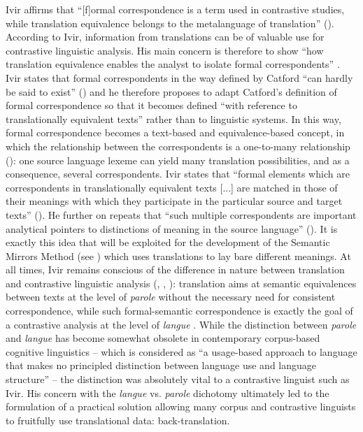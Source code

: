 Ivir affirms that “[f]ormal correspondence is a term used in contrastive studies, while translation equivalence belongs to the metalanguage of translation” (\citeyear[51]{ivir_formal_1981}). According to Ivir, information from translations can be of valuable use for contrastive linguistic analysis. His main concern is therefore to show “how translation equivalence enables the analyst to isolate formal correspondents” \citep[58]{ivir_formal_1981}. Ivir states that formal correspondents in the way defined by Catford “can hardly be said to exist” (\citeyear[54]{ivir_formal_1981}) and he therefore proposes to adapt Catford’s definition of formal correspondence so that it becomes defined “with reference to translationally equivalent texts” \citep[55]{ivir_formal_1981} rather than to linguistic systems. In this way, formal correspondence becomes a text-based and equivalence-based concept, in which the relationship between the correspondents is a one-to-many relationship (\citeyear[55]{ivir_formal_1981}): one source language lexeme can yield many translation possibilities, and as a consequence, several correspondents. Ivir states that “formal elements which are correspondents in translationally equivalent texts [...] are matched in those of their meanings with which they participate in the particular source and target texts” (\citeyear[55]{ivir_formal_1981}). He further on repeats that “such multiple correspondents are important analytical pointers to distinctions of meaning in the source language” (\citeyear[56]{ivir_formal_1981}). It is exactly this idea that will be exploited for the development of the Semantic Mirrors Method (see ) which uses translations to lay bare different meanings. At all times, Ivir remains conscious of the difference in nature between translation and contrastive linguistic analysis (\citealt[15]{ivir_contrasting_1969}, \citealt[17]{ivir_remarks_1970}, \citealt[173]{ivir_translation-based_1983}): translation aims at semantic equivalences between texts at the level of \textit{parole} without the necessary need for consistent correspondence, while such formal-semantic correspondence is exactly the goal of a contrastive analysis at the level of \textit{langue} \citep[15]{ivir_contrasting_1969}. While the distinction between \textit{parole} and \textit{langue} has become somewhat obsolete in contemporary corpus-based cognitive linguistics – which is considered as “a usage-based approach to language that makes no principled distinction between language use and language structure” \citep[151]{glynn_visualizing_2014} – the distinction was absolutely vital to a contrastive linguist such as Ivir. His concern with the \textit{langue} vs. \textit{parole} dichotomy ultimately led to the formulation of a practical solution allowing many corpus and contrastive linguists to fruitfully use translational data: back-translation.

